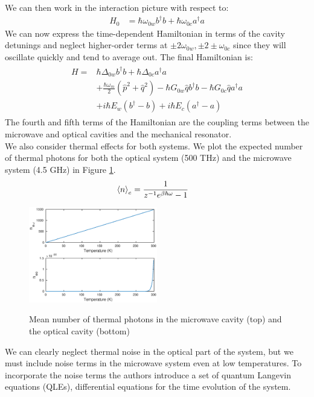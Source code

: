 \documentclass[a4paper,11pt, twocolumn]{article}
\numberwithin{equation}{section}
\begin{document}
We can then work in the interaction picture with respect to:
\begin{align}
 H_0 &= \hbar\omega_{0w}b^\dagger b +\hbar\omega_{0c}a^\dagger a
\end{align}
We can now express the time-dependent Hamiltonian in terms of the cavity detunings and neglect higher-order terms at $\pm2\omega_{0w},\pm2\pm\omega_{0c}$ since they will oscillate quickly and tend to average out.
The final Hamiltonian is:
\begin{align}
\begin{split}
 H = &\hbar\Delta_{0w}b^\dagger b+\hbar\Delta_{0c}a^\dagger a\\
     &+\frac{\hbar\omega_m}{2}(\hat{p}^2+\hat{q}^2)-\hbar G_{0w}\hat{q}b^\dagger b-\hbar G_{0c}\hat{q}a^\dagger a\\
     &+i\hbar E_w(b^\dagger -b)+i\hbar E_c(a^\dagger -a )
\end{split}
\end{align}
The fourth and fifth terms of the Hamiltonian are the coupling terms between the microwave and optical cavities and the mechanical resonator.\\ 
We also consider thermal effects for both systems. We plot the expected number of thermal photons for both the optical system (500 THz) and the microwave system (4.5 GHz) in Figure \ref{fig:thermalnoise}.
\begin{align}
 \braket{n}_e &= \frac{1}{z^{-1}e^{\beta \hbar \omega}-1}
\end{align}
\begin{figure}
 \caption{Mean number of thermal photons in the microwave cavity (top) and the optical cavity (bottom)}
 \centering
   \includegraphics[width=0.5\textwidth]{figs/ThermalPhotons}
 \label{fig:thermalnoise}
\end{figure}
We can clearly neglect thermal noise in the optical part of the system, but we must include noise terms in the microwave system even at low temperatures.
To incorporate the noise terms the authors introduce a set of quantum Langevin equations (QLEs), differential equations for the time evolution of the system.
\end{document}
